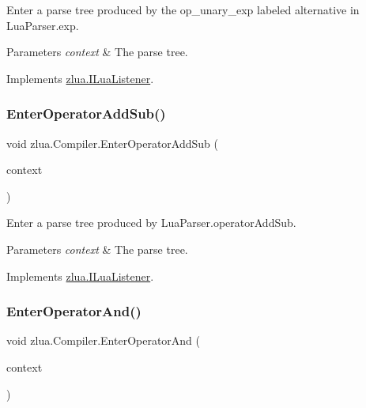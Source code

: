 Enter a parse tree produced by the {\ttfamily op\+\_\+unary\+\_\+exp} labeled alternative in Lua\+Parser.\+exp. 


\begin{DoxyParams}{Parameters}
{\em context} & The parse tree.\\
\hline
\end{DoxyParams}


Implements \mbox{\hyperlink{interfacezlua_1_1_i_lua_listener_ab264dde9b798933c740a470090b2db94}{zlua.\+I\+Lua\+Listener}}.

\mbox{\label{classzlua_1_1_compiler_ad766e6d486cd81a33eca68f94ed7fb79}} 
\subsubsection{\texorpdfstring{Enter\+Operator\+Add\+Sub()}{EnterOperatorAddSub()}}
{\footnotesize\ttfamily void zlua.\+Compiler.\+Enter\+Operator\+Add\+Sub (\begin{DoxyParamCaption}\item[{\mbox{[}\+Not\+Null\mbox{]} \mbox{\hyperlink{classzlua_1_1_lua_parser_1_1_operator_add_sub_context}{Lua\+Parser.\+Operator\+Add\+Sub\+Context}}}]{context }\end{DoxyParamCaption})}



Enter a parse tree produced by Lua\+Parser.\+operator\+Add\+Sub. 


\begin{DoxyParams}{Parameters}
{\em context} & The parse tree.\\
\hline
\end{DoxyParams}


Implements \mbox{\hyperlink{interfacezlua_1_1_i_lua_listener_a145cf8b9fa700148a09b9d68624640f8}{zlua.\+I\+Lua\+Listener}}.

\mbox{\label{classzlua_1_1_compiler_a028404702602498261a23021b36b5a87}} 
\subsubsection{\texorpdfstring{Enter\+Operator\+And()}{EnterOperatorAnd()}}
{\footnotesize\ttfamily void zlua.\+Compiler.\+Enter\+Operator\+And (\begin{DoxyParamCaption}\item[{\mbox{[}\+Not\+Null\mbox{]} \mbox{\hyperlink{classzlua_1_1_lua_parser_1_1_operator_and_context}{Lua\+Parser.\+Operator\+And\+Context}}}]{context }\end{DoxyParamCaption})}



